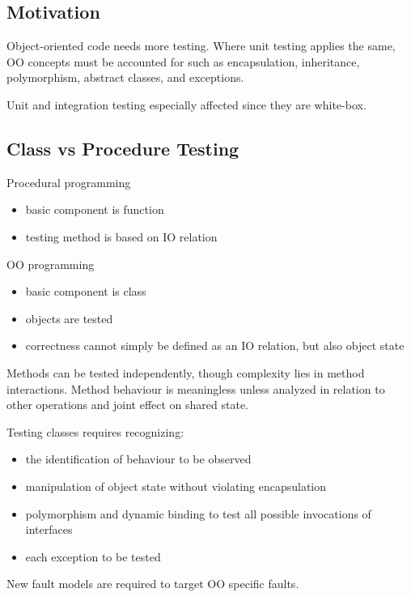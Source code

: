 \documentclass[11pt]{article}
\begin{document}
\subsection{Motivation}
\label{sec:org6b1a38e}
Object-oriented code needs more testing.
Where unit testing applies the same, OO concepts must be accounted for
such as encapsulation, inheritance, polymorphism, abstract classes, and exceptions.

Unit and integration testing especially affected since they are white-box.
\subsection{Class vs Procedure Testing}
\label{sec:org10238a3}
Procedural programming
\begin{itemize}
\item basic component is function
\item testing method is based on IO relation
\end{itemize}

OO programming
\begin{itemize}
\item basic component is class
\item objects are tested
\item correctness cannot simply be defined as an IO relation, but also object state
\end{itemize}

Methods can be tested independently, though complexity lies in method interactions.
Method behaviour is meaningless unless analyzed in relation to other operations
and joint effect on shared state.

Testing classes requires recognizing:
\begin{itemize}
\item the identification of behaviour to be observed
\item manipulation of object state without violating encapsulation
\item polymorphism and dynamic binding to test all possible invocations of interfaces
\item each exception to be tested
\end{itemize}

New fault models are required to target OO specific faults.
\end{document}
